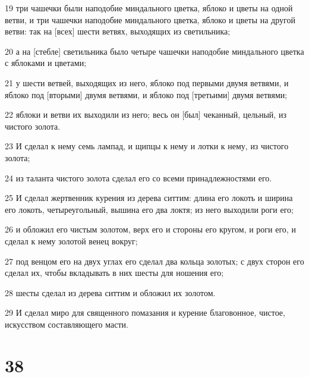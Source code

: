 \par 19 три чашечки были наподобие миндального цветка, яблоко и цветы на одной ветви, и три чашечки наподобие миндального цветка, яблоко и цветы на другой ветви: так на [всех] шести ветвях, выходящих из светильника;
\par 20 а на [стебле] светильника было четыре чашечки наподобие миндального цветка с яблоками и цветами;
\par 21 у шести ветвей, выходящих из него, яблоко под первыми двумя ветвями, и яблоко под [вторыми] двумя ветвями, и яблоко под [третьими] двумя ветвями;
\par 22 яблоки и ветви их выходили из него; весь он [был] чеканный, цельный, из чистого золота.
\par 23 И сделал к нему семь лампад, и щипцы к нему и лотки к нему, из чистого золота;
\par 24 из таланта чистого золота сделал его со всеми принадлежностями его.
\par 25 И сделал жертвенник курения из дерева ситтим: длина его локоть и ширина его локоть, четыреугольный, вышина его два локтя; из него выходили роги его;
\par 26 и обложил его чистым золотом, верх его и стороны его кругом, и роги его, и сделал к нему золотой венец вокруг;
\par 27 под венцом его на двух углах его сделал два кольца золотых; с двух сторон его сделал их, чтобы вкладывать в них шесты для ношения его;
\par 28 шесты сделал из дерева ситтим и обложил их золотом.
\par 29 И сделал миро для священного помазания и курение благовонное, чистое, искусством составляющего масти.

\chapter{38}

